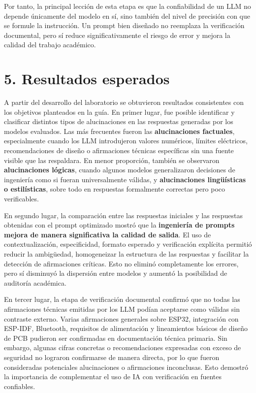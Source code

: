 \documentclass[11pt,a4paper]{article}
\begin{document}
Por tanto, la principal lección de esta etapa es que la confiabilidad de un LLM no depende únicamente del modelo en sí, sino también del nivel de precisión con que se formule la instrucción. Un prompt bien diseñado no reemplaza la verificación documental, pero sí reduce significativamente el riesgo de error y mejora la calidad del trabajo académico.



\section{5. Resultados esperados}

A partir del desarrollo del laboratorio se obtuvieron resultados consistentes con los objetivos planteados en la guía. En primer lugar, fue posible identificar y clasificar distintos tipos de alucinaciones en las respuestas generadas por los modelos evaluados. Las más frecuentes fueron las \textbf{alucinaciones factuales}, especialmente cuando los LLM introdujeron valores numéricos, límites eléctricos, recomendaciones de diseño o afirmaciones técnicas específicas sin una fuente visible que las respaldara. En menor proporción, también se observaron \textbf{alucinaciones lógicas}, cuando algunos modelos generalizaron decisiones de ingeniería como si fueran universalmente válidas, y \textbf{alucinaciones lingüísticas o estilísticas}, sobre todo en respuestas formalmente correctas pero poco verificables.

En segundo lugar, la comparación entre las respuestas iniciales y las respuestas obtenidas con el prompt optimizado mostró que la \textbf{ingeniería de prompts mejora de manera significativa la calidad de salida}. El uso de contextualización, especificidad, formato esperado y verificación explícita permitió reducir la ambigüedad, homogeneizar la estructura de las respuestas y facilitar la detección de afirmaciones críticas. Esto no eliminó completamente los errores, pero sí disminuyó la dispersión entre modelos y aumentó la posibilidad de auditoría académica.

En tercer lugar, la etapa de verificación documental confirmó que no todas las afirmaciones técnicas emitidas por los LLM podían aceptarse como válidas sin contraste externo. Varias afirmaciones generales sobre ESP32, integración con ESP-IDF, Bluetooth, requisitos de alimentación y lineamientos básicos de diseño de PCB pudieron ser confirmadas en documentación técnica primaria. Sin embargo, algunas cifras concretas o recomendaciones expresadas con exceso de seguridad no lograron confirmarse de manera directa, por lo que fueron consideradas potenciales alucinaciones o afirmaciones inconclusas. Esto demostró la importancia de complementar el uso de IA con verificación en fuentes confiables.
\end{document}
